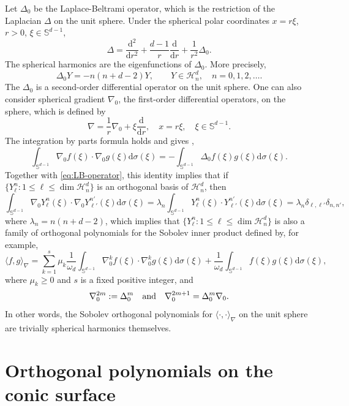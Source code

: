 \documentclass{amsart}
\theoremstyle{remark}
\def\la{{\langle}}
\def\ra{{\rangle}}
\def\d{\mathrm{d}}
\def\sph{{\mathbb{S}^{d-1}}}
\def\l{{\lambda}}
\def\o{{\omega}}
\def\s{\sigma}
\def\la{{\langle}}
\def\ra{{\rangle}}
\def\CH{{\mathcal H}}
\def\f{\frac}
\begin{document}
Let $\Delta_0$ be the Laplace-Beltrami operator, which is the restriction of the Laplacian $\Delta$ on
the unit sphere. Under the spherical polar coordinates $x = r \xi$, $r > 0$, $\xi \in \sph$,
$$
  \Delta = \frac{\d^2}{\d r^2} + \frac{d-1}{r}  \frac{\d}{\d r} + \frac{1}{r^2} \Delta_0.
$$
The spherical harmonics are the eigenfunctions of $\Delta_0$. More precisely,
\begin{equation}\label{eq:LB-operator}
   \Delta_0 Y = - n (n+d-2)Y, \qquad Y \in \CH_n^d, \quad n=0,1,2,\ldots.
\end{equation}
The $\Delta_0$ is a second-order differential operator on the unit sphere. One can also consider
spherical gradient $\nabla_0$, the first-order differential operators, on the sphere, which is defined by
\begin{equation}\label{eq:nabla0}
     \nabla = \frac{1}{r} \nabla_0 + \xi \frac{\d}{\d r}, \quad x = r \xi, \quad \xi \in \sph.
\end{equation}
The integration by parts formula holds and gives \cite[(1.8.14)]{DaiX},
\begin{equation}\label{eq:int-sph}
   \int_{\sph} \nabla_0 f(\xi) \cdot  \nabla_0 g(\xi) \d \s(\xi) = - \int_{\sph} \Delta_0 f(\xi) g(\xi) \d \s(\xi).
\end{equation}
Together with \eqref{eq:LB-operator}, this identity implies that if $\{Y_\ell^n : 1 \le \ell \le \dim \CH_n^d\}$ is
an orthogonal basis of $\CH_n^d$, then
$$
 \int_{\sph} \nabla_0 Y_\ell^n(\xi) \cdot  \nabla_0 Y_{\ell'}^{n'}(\xi) \d \s(\xi)
     =\l_n \int_{\sph} Y_\ell^n(\xi) \cdot Y_{\ell'}^{n'}(\xi) \d \s(\xi) = \l_n \delta_{\ell,\ell'} \delta_{n,n'},
$$
where $\l_n = n(n+d-2)$, which implies that $\{Y_\ell^n : 1 \le \ell \le \dim \CH_n^d\}$ is also a family
of orthogonal polynomials for the Sobolev inner product defined by, for example,
\begin{equation}\label{eq:SOP-sph}
 \la f,g \ra_{\nabla} = \sum_{k=1}^s \mu_k
 \f 1 {\o_d} \int_{\sph} \nabla_0^k f(\xi) \cdot  \nabla_0^k g(\xi) \d \s(\xi) +  \f 1 {\o_d} \int_{\sph}   f(\xi) g(\xi) \d \s(\xi),
\end{equation}
where $\mu_k \ge 0$ and $s$ is a fixed positive integer, and
$$
   \nabla_0^{2m} := \Delta_0^m \quad\hbox{and} \quad \nabla_0^{2m+1} = \Delta_0^m \nabla_0.
$$
 In other words, the Sobolev orthogonal polynomials for $\la \cdot,\cdot\ra_\nabla$ on the unit sphere are trivially
 spherical harmonics themselves.
 
\section{Orthogonal polynomials on the conic surface}
\setcounter{equation}{0}
\end{document}
